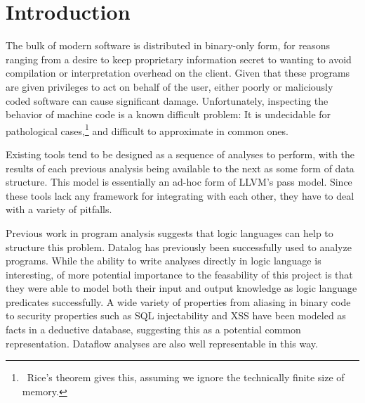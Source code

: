 \chapter{Introduction}
%
%
The bulk of modern software is distributed in binary-only form, for reasons ranging from a desire to keep proprietary information secret to wanting to avoid compilation or interpretation overhead on the client.
Given that these programs are given privileges to act on behalf of the user, either poorly or maliciously coded software can cause significant damage.
Unfortunately, inspecting the behavior of machine code is a known difficult problem:
It is undecidable for pathological cases,\footnote{\
        Rice's theorem gives this, assuming we ignore the technically finite size of memory.
} and difficult to approximate in common ones.
 
Existing tools\cite{ida} tend to be designed as a sequence of analyses to perform, with the results of each previous analysis being available to the next as some form of data structure.
This model is essentially an ad-hoc form of LLVM\cite{llvm}'s pass model.
Since these tools lack any framework for integrating with each other, they have to deal with a variety of pitfalls.

Previous work in program analysis suggests that logic languages can help to structure this problem.
Datalog has previously been successfully used to analyze programs\cite{Lam2005a, Brumley2006b, Alpuente2011, Smaragdakis, Whaley2007}. 
While the ability to write analyses directly in logic language is interesting, of more potential importance to the feasability of this project is that they were able to model both their input and output knowledge as logic language predicates successfully.
A wide variety of properties from aliasing in binary code\cite{Brumley2006b} to security properties such as SQL injectability and XSS\cite{Lam2005a} have been modeled as facts in a deductive database, suggesting this as a potential common representation. 
Dataflow analyses are also well representable\cite{McAllester} in this way.

